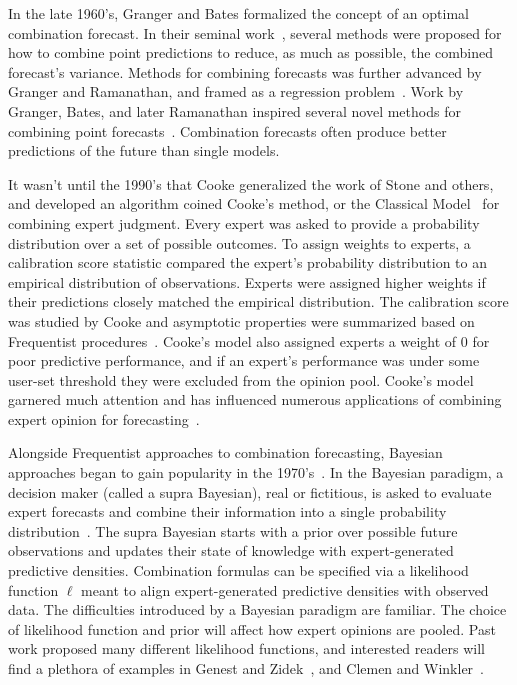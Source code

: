 \documentclass[preprint,authoryear,nonatbib]{elsarticle}
\begin{document}
In the late 1960's, Granger and Bates formalized the concept of an optimal combination forecast.
In their seminal work~\parencite{bates1969combination}, several methods were proposed for how to combine point predictions to reduce, as much as possible, the combined forecast's variance.
Methods for combining forecasts was further advanced by Granger and Ramanathan, and framed as a regression problem~\parencite{granger1984improved}.
Work by Granger, Bates, and later Ramanathan inspired several novel methods for combining point forecasts~\parencite{gneiting2013combining,hora2015calibration,cooke1991experts,wallis2011combining}.
Combination forecasts often produce better predictions of the future than single models.

It wasn't until the 1990's that Cooke generalized the work of Stone and others, and developed an algorithm coined Cooke's method, or the Classical Model~\parencite{cooke1988calibration,cooke1991experts} for combining expert judgment.
Every expert was asked to provide a probability distribution over a set of possible outcomes.
To assign weights to experts, a calibration score statistic compared the expert's probability distribution to an empirical distribution of observations.
Experts were assigned higher weights if their predictions closely matched the empirical distribution.
The calibration score was studied by Cooke and asymptotic properties were summarized based on Frequentist procedures~\parencite{cooke1988calibration,cooke2015aggregation}.
Cooke's model also assigned experts a weight of $0$ for poor predictive performance, and
if an expert's performance was under some user-set threshold they were excluded from the opinion pool.
Cooke's model garnered much attention and has influenced numerous applications of combining expert opinion for forecasting~\parencite{cooke2014validating,clemen2008comment,cooke2015aggregation,cooke2014out,morales2017characterization,zio1996use,hanea2018value,hathout2016uncertainty,bolger2017deriving,clemen2007advances,brito2012behavioral,hora2015calibration, ISI:000327676900001}.

Alongside Frequentist approaches to combination forecasting, Bayesian approaches began to gain popularity in the 1970's~\parencite{morris1974decision}.
In the Bayesian paradigm, a decision maker (called a supra Bayesian), real or fictitious, is asked to evaluate expert forecasts and combine their information into a single probability distribution~\parencite{hogarth1975cognitive,keeney1976group}.
The supra Bayesian starts with a prior over possible future observations and updates their state of knowledge with expert-generated predictive densities.
Combination formulas can be specified via a likelihood function $\ell$ meant to align expert-generated predictive densities with observed data.
The difficulties introduced by a Bayesian paradigm are familiar.
The choice of likelihood function and prior will affect how expert opinions are pooled. 
Past work proposed many different likelihood functions, and interested readers will find a plethora of examples in Genest and Zidek~\parencite{genest1986combining}, and Clemen and Winkler~\parencite{clemen1999combining,clemen1986combining,clemen1989combining}.
\end{document}

